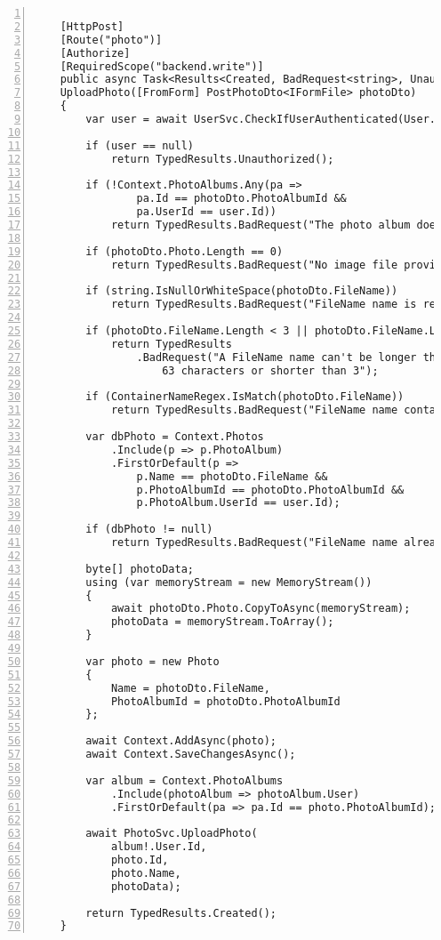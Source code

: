 \begin{lstlisting}[numbers=left,caption={Methode UplaodPhoto},label={lst:method-upload-photo}]
 
    [HttpPost]
    [Route("photo")]
    [Authorize]
    [RequiredScope("backend.write")]
    public async Task<Results<Created, BadRequest<string>, UnauthorizedHttpResult>> 
    UploadPhoto([FromForm] PostPhotoDto<IFormFile> photoDto)
    {
        var user = await UserSvc.CheckIfUserAuthenticated(User.Claims, true);
        
        if (user == null) 
            return TypedResults.Unauthorized();
        
        if (!Context.PhotoAlbums.Any(pa => 
                pa.Id == photoDto.PhotoAlbumId &&
                pa.UserId == user.Id))
            return TypedResults.BadRequest("The photo album doesn't exist.");
        
        if (photoDto.Photo.Length == 0)
            return TypedResults.BadRequest("No image file provided.");
        
        if (string.IsNullOrWhiteSpace(photoDto.FileName))
            return TypedResults.BadRequest("FileName name is required");
        
        if (photoDto.FileName.Length < 3 || photoDto.FileName.Length > 63)
            return TypedResults
                .BadRequest("A FileName name can't be longer than 
                    63 characters or shorter than 3");
        
        if (ContainerNameRegex.IsMatch(photoDto.FileName))
            return TypedResults.BadRequest("FileName name contains invalid characters");
        
        var dbPhoto = Context.Photos
            .Include(p => p.PhotoAlbum)
            .FirstOrDefault(p =>
                p.Name == photoDto.FileName &&
                p.PhotoAlbumId == photoDto.PhotoAlbumId &&
                p.PhotoAlbum.UserId == user.Id);
        
        if (dbPhoto != null) 
            return TypedResults.BadRequest("FileName name already exists");
        
        byte[] photoData;
        using (var memoryStream = new MemoryStream())
        {
            await photoDto.Photo.CopyToAsync(memoryStream);
            photoData = memoryStream.ToArray();
        }
        
        var photo = new Photo
        {
            Name = photoDto.FileName,
            PhotoAlbumId = photoDto.PhotoAlbumId
        };
        
        await Context.AddAsync(photo);
        await Context.SaveChangesAsync();
        
        var album = Context.PhotoAlbums
            .Include(photoAlbum => photoAlbum.User)
            .FirstOrDefault(pa => pa.Id == photo.PhotoAlbumId);
        
        await PhotoSvc.UploadPhoto(
            album!.User.Id,
            photo.Id,
            photo.Name,
            photoData);
        
        return TypedResults.Created();
    }
\end{lstlisting}

